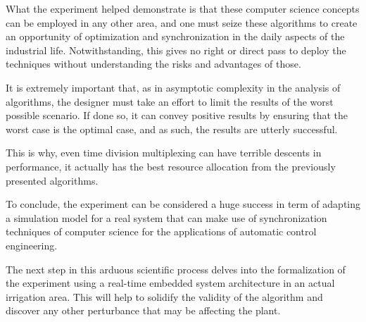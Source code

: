 \documentclass[12pt]{article}
\begin{document}
What the experiment helped demonstrate is that these computer science concepts can be employed in any other area, and one must seize these algorithms to create an opportunity of optimization and synchronization in the daily aspects of the industrial life. Notwithstanding, this gives no right or direct pass to deploy the techniques without understanding the risks and advantages of those.

It is extremely important that, as in asymptotic complexity in the analysis of algorithms, the designer must take an effort to limit the results of the worst possible scenario. If done so, it can convey positive results by ensuring that the worst case is the optimal case, and as such, the results are utterly successful.

This is why, even time division multiplexing can have terrible descents in performance, it actually has the best resource allocation from the previously presented algorithms.

To conclude, the experiment can be considered a huge success in term of adapting a simulation model for a real system that can make use of synchronization techniques of computer science for the applications of automatic control engineering.

The next step in this arduous scientific process delves into the formalization of the experiment using a real-time embedded system architecture in an actual irrigation area. This will help to solidify the validity of the algorithm and discover any other perturbance that may be affecting the plant.



\end{document}
